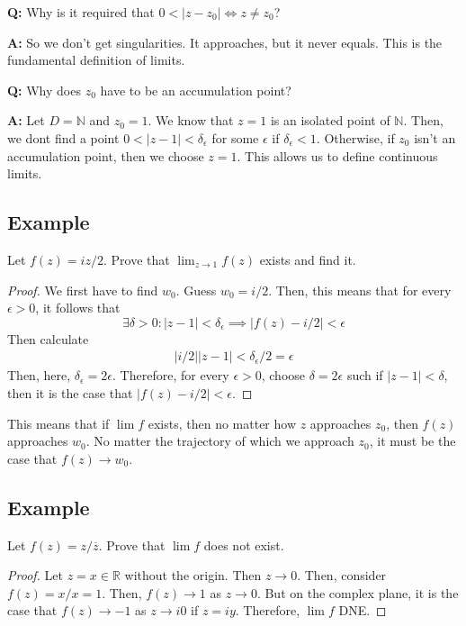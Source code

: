 \documentclass{article}
\newtheorem{one minute paper}[theorem]{One Minute Paper}
\begin{document}
\textbf{Q:} Why is it required that $0 < |z - z_0| \iff z \neq z_0$? 

\textbf{A:} So we don't get singularities. It approaches, but it never equals. This is the fundamental definition of limits. 

\textbf{Q:} Why does $z_0$ have to be an accumulation point? 

\textbf{A:} Let $D = \mathbb{N}$ and $z_0 = 1$. We know that $z=1$ is an isolated point of $\mathbb{N}$. Then, we dont find a point $0 < |z - 1| < \delta_\epsilon$ for some $\epsilon$ if $\delta_{\epsilon} < 1$. Otherwise, if $z_0$ isn't an accumulation point, then we choose $z = 1$. This allows
us to define continuous limits. 

\subsection*{Example}

Let $f(z) = iz/2$. Prove that $\lim_{z\rightarrow 1}f(z)$ exists and find it. 

\begin{proof}
    We first have to find $w_0$. Guess $w_0 = i/2$. Then, this means that for every $\epsilon > 0$, it follows that 
    \begin{equation}
        \exists \delta > 0: |z - 1| < \delta_\epsilon \implies |f(z) - i/2| < \epsilon
    \end{equation}
    Then calculate 
    \begin{align}
        |i/2||z - 1| < \delta_{\epsilon}/2  = \epsilon 
    \end{align}
    Then, here, $\delta_{\epsilon} = 2\epsilon$. Therefore, for every $\epsilon >0$, choose $\delta = 2\epsilon$ such if $|z - 1| < \delta$, then it is the case that $|f(z) - i/2| < \epsilon$. 
\end{proof}

This means that if $\lim f$ exists, then no matter how $z$ approaches $z_0$, then $f(z)$ approaches $w_0$. No matter the trajectory of which we approach $z_0$, it must be the case that $f(z) \rightarrow w_0$. 

\subsection*{Example}

Let $f(z) = z/\overline{z}$. Prove that $\lim f$ does not exist. 

\begin{proof}
    Let $z = x \in \mathbb{R}$ without the origin. Then $z \rightarrow 0$. Then, consider $f(z) = x/x = 1$. Then, $f(z) \rightarrow 1$ as $z \rightarrow 0$. But on the complex plane, 
    it is the case that $f(z) \rightarrow -1$ as $z \rightarrow i0$ if $z = iy$. Therefore, $\lim f$ DNE. 
\end{proof}
\end{document}
